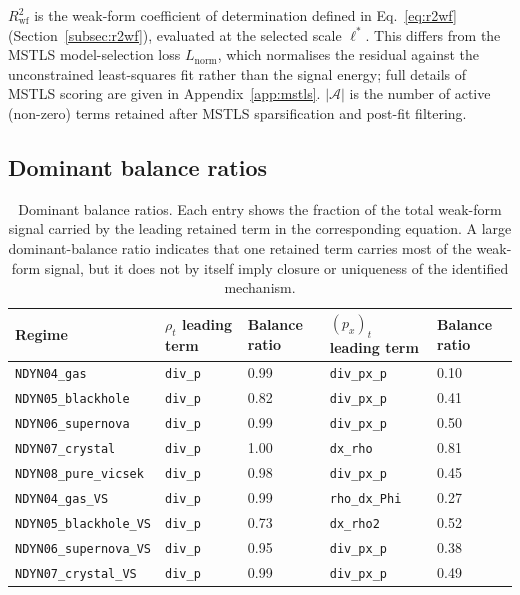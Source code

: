 $R^2_{\text{wf}}$ is the weak-form coefficient of determination
defined in Eq.~\eqref{eq:r2wf} (Section~\ref{subsec:r2wf}),
evaluated at the selected scale $\boldsymbol{\ell}^*$.
This differs from the MSTLS model-selection loss
$L_{\mathrm{norm}}$, which normalises the residual against the
unconstrained least-squares fit rather than the signal energy;
full details of MSTLS scoring are given in Appendix~\ref{app:mstls}.
$|\mathcal{A}|$ is the number of active (non-zero) terms retained after
MSTLS sparsification and post-fit filtering.

\subsection{Dominant balance ratios}

\begin{table}[ht]
\centering
\caption{Dominant balance ratios.  Each entry shows the fraction
of the total weak-form signal carried by the leading retained term in the
corresponding equation.  A large dominant-balance ratio indicates that
one retained term carries most of the weak-form signal, but it does not
by itself imply closure or uniqueness of the identified mechanism.}
\label{tab:wsindy_dominant_balance}
\renewcommand{\arraystretch}{0.95}
\small
\begin{tabular}{lllll}
\toprule
\textbf{Regime} & $\rho_t$ leading term & Balance ratio & $(p_x)_t$ leading term & Balance ratio \\
\midrule
\texttt{NDYN04\_gas} & \texttt{div\_p} & 0.99 & \texttt{div\_px\_p} & 0.10 \\
\texttt{NDYN05\_blackhole} & \texttt{div\_p} & 0.82 & \texttt{div\_px\_p} & 0.41 \\
\texttt{NDYN06\_supernova} & \texttt{div\_p} & 0.99 & \texttt{div\_px\_p} & 0.50 \\
\texttt{NDYN07\_crystal} & \texttt{div\_p} & 1.00 & \texttt{dx\_rho} & 0.81 \\
\texttt{NDYN08\_pure\_vicsek} & \texttt{div\_p} & 0.98 & \texttt{div\_px\_p} & 0.45 \\
\midrule
\texttt{NDYN04\_gas\_VS} & \texttt{div\_p} & 0.99 & \texttt{rho\_dx\_Phi} & 0.27 \\
\texttt{NDYN05\_blackhole\_VS} & \texttt{div\_p} & 0.73 & \texttt{dx\_rho2} & 0.52 \\
\texttt{NDYN06\_supernova\_VS} & \texttt{div\_p} & 0.95 & \texttt{div\_px\_p} & 0.38 \\
\texttt{NDYN07\_crystal\_VS} & \texttt{div\_p} & 0.99 & \texttt{div\_px\_p} & 0.49 \\
\bottomrule
\end{tabular}
\end{table}

